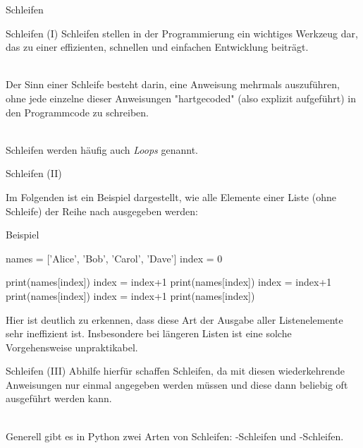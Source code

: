     \begin{subsection}{Schleifen}
        
        \begin{frame}{Schleifen (I)}
            Schleifen stellen in der Programmierung ein wichtiges Werkzeug dar, das zu einer effizienten, schnellen und einfachen Entwicklung beiträgt. \\~\
            
            Der Sinn einer Schleife besteht darin, eine Anweisung mehrmals auszuführen, ohne jede einzelne dieser Anweisungen "hartgecoded" (also explizit aufgeführt) in den Programmcode zu schreiben. \\~\
            
            Schleifen werden häufig auch \textit{Loops} genannt.
        \end{frame}
        
        \begin{frame}[fragile]{Schleifen (II)}
        
            Im Folgenden ist ein Beispiel dargestellt, wie alle Elemente einer Liste (ohne Schleife) der Reihe nach ausgegeben werden: 
            
            \begin{exampleblock}{Beispiel}
\begin{pythoncode}
names = ['Alice', 'Bob', 'Carol', 'Dave']
index = 0

print(names[index])
index = index+1
print(names[index])
index = index+1
print(names[index])
index = index+1
print(names[index])
\end{pythoncode}            
            \end{exampleblock}
            
            Hier ist deutlich zu erkennen, dass diese Art der Ausgabe aller Listenelemente sehr ineffizient ist. Insbesondere bei längeren Listen ist eine solche Vorgehensweise unpraktikabel.
        \end{frame}
        
        \begin{frame}[fragile]{Schleifen (III)}
            Abhilfe hierfür schaffen Schleifen, da mit diesen wiederkehrende Anweisungen nur einmal angegeben werden müssen und diese dann beliebig oft ausgeführt werden kann. \\~\
            
            Generell gibt es in Python zwei Arten von Schleifen: -Schleifen und -Schleifen. \\~\
            

\end{frame}
\end{subsection}
